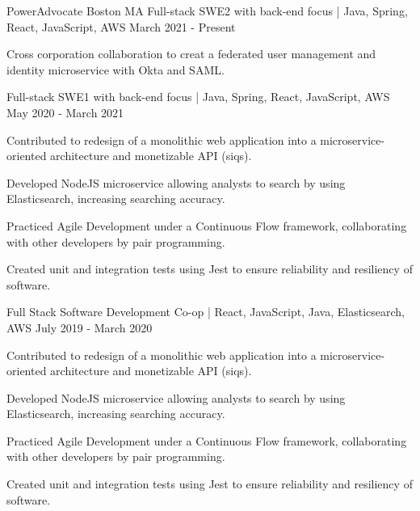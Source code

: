 
\begin{cventries}
\cventrythreepositions
    {PowerAdvocate}
    {Boston MA}
    {Full-stack SWE2 with back-end focus | Java, Spring, React, JavaScript, AWS} %
    {March 2021 - Present} %
    {
        \begin{cvitems} %
            \item {Cross corporation collaboration to creat a federated user management and identity microservice with Okta and SAML.}
        \end{cvitems}
    }
    {Full-stack SWE1 with back-end focus | Java, Spring, React, JavaScript, AWS}
    {May 2020 - March 2021}
    {
      \begin{cvitems} %
        \item {Contributed to redesign of a monolithic web application into a microservice-oriented architecture and monetizable API (siqs).}
        \item {Developed NodeJS microservice allowing analysts to search by using Elasticsearch, increasing searching accuracy.}
        \item {Practiced Agile Development under a Continuous Flow framework, collaborating with other developers by pair programming.}
        \item {Created unit and integration tests using Jest to ensure reliability and resiliency of software.}
      \end{cvitems}
    }
    {Full Stack Software Development Co-op | React, JavaScript, Java, Elasticsearch, AWS}
    {July 2019 - March 2020}
    {
      \begin{cvitems} %
        \item {Contributed to redesign of a monolithic web application into a microservice-oriented architecture and monetizable API (siqs).}
        \item {Developed NodeJS microservice allowing analysts to search by using Elasticsearch, increasing searching accuracy.}
        \item {Practiced Agile Development under a Continuous Flow framework, collaborating with other developers by pair programming.}
        \item {Created unit and integration tests using Jest to ensure reliability and resiliency of software.}
      \end{cvitems}
    }


\end{cventries}
